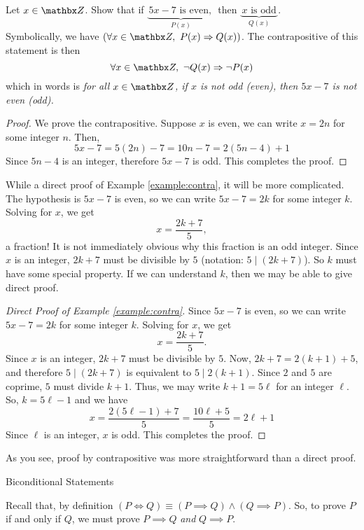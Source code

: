 \begin{example}\label{example:contra}
Let $x \in \zz$. Show that if $\underbrace{\,5x - 7 \text{ is even},\,}_{P(x)}$ then $\underbrace{\,x \text{ is odd}\,}_{Q(x)}$.\\[0.5em]
Symbolically, we have $(\forall x \in \zz,\ P(x) \implies Q(x))$. The contrapositive of this statement is then 
\[\forall x \in \zz,\ \neg Q(x) \implies \neg P(x)\]
which in words is \emph{for all $x \in \zz$, if $x$ is not odd (even), then $5x - 7$ is not even (odd).}
\end{example}
\begin{proof}
We prove the contrapositive. Suppose $x$ is even, we can write $x = 2n$ for some integer $n$. Then,
\[5x - 7 = 5(2n) - 7 = 10n - 7 = 2(5n - 4) + 1\]
Since $5n-4$ is an integer, therefore $5x - 7$ is odd. This completes the proof.
\end{proof}

\vspace*{1em}

\begin{remark}
While a direct proof of Example \ref{example:contra}, it will be more complicated. The hypothesis is $5x - 7$ is even, so we can write $5x - 7 = 2k$ for some integer $k$. Solving for $x$, we get
\[x = \frac{2k + 7}{5},\]
a fraction! It is not immediately obvious why this fraction is an odd integer. Since $x$ is an integer, $2k + 7$ must be divisible by $5$ (notation: $5 \mid (2k + 7)$). So $k$ must have some special property. If we can understand $k$, then we may be able to give  direct proof.  
\begin{proof}[Direct Proof of Example \ref{example:contra}]
Since $5x - 7$ is even, so we can write $5x - 7 = 2k$ for some integer $k$. Solving for $x$, we get
\[x = \frac{2k + 7}{5}.\]
Since $x$ is an integer, $2k + 7$ must be divisible by $5$. Now, $2k + 7 = 2(k+1) + 5$, and therefore $5\mid (2k + 7)$ is equivalent to $5\mid 2(k+1)$. Since $2$ and $5$ are coprime, $5$ must divide $k + 1$. Thus, we may write $k +1 = 5\ell$ for an integer $\ell$. So, $k = 5\ell - 1$ and we have
\[x = \frac{2(5\ell - 1) + 7}{5} = \frac{10\ell + 5}{5} = 2\ell + 1\]
Since $\ell$ is an integer, $x$ is odd. This completes the proof.
\end{proof}
\end{remark}
As you see, proof by contrapositive was more straightforward than a direct proof. 

\vspace*{2em}

\begin{mdframed}
\begin{center}
{\Large Biconditional Statements}
\end{center}
\end{mdframed}
Recall that, by definition $(P \iff Q) \equiv (P \implies Q) \land (Q \implies P)$. So, to prove $P$ if and only if $Q$, we must prove $P \implies Q$ \emph{and} $Q \implies P$. 

